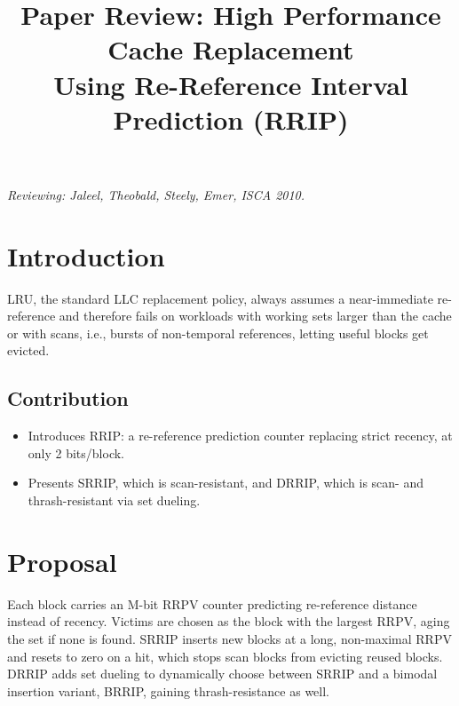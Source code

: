 \documentclass[10pt, conference]{IEEEtran}
\newcommand{\paperAuthors}{Jaleel, Theobald, Steely, Emer}
\newcommand{\paperVenue}{ISCA 2010}
\begin{document}
\title{\Large\bfseries Paper Review: High Performance Cache Replacement\\Using Re-Reference Interval Prediction (RRIP)}

\author{
}

\maketitle

\begin{center}
\textit{Reviewing: \paperAuthors, \paperVenue.}
\end{center}
\vspace{-8pt}

\section{Introduction}
LRU, the standard LLC replacement policy, always assumes a near-immediate re-reference and therefore fails on workloads with working sets larger than the cache or with scans, i.e., bursts of non-temporal references, letting useful blocks get evicted.

\subsection{Contribution}
\begin{itemize}[leftmargin=*, itemsep=0pt, topsep=1pt, parsep=0pt]
    \item Introduces RRIP: a re-reference prediction counter replacing strict recency, at only 2 bits/block.
    \item Presents SRRIP, which is scan-resistant, and DRRIP, which is scan- and thrash-resistant via set dueling.
\end{itemize}

\section{Proposal}
Each block carries an M-bit RRPV counter predicting re-reference distance instead of recency. Victims are chosen as the block with the largest RRPV, aging the set if none is found. SRRIP inserts new blocks at a long, non-maximal RRPV and resets to zero on a hit, which stops scan blocks from evicting reused blocks. DRRIP adds set dueling to dynamically choose between SRRIP and a bimodal insertion variant, BRRIP, gaining thrash-resistance as well.
\end{document}
